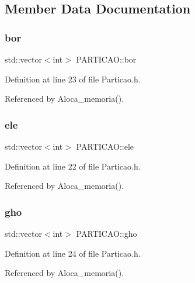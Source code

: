 \subsection{Member Data Documentation}
\mbox{\label{structPARTICAO_ac37aba358c6ada60310d8ebc054ffb5c}} 
\subsubsection{\texorpdfstring{bor}{bor}}
{\footnotesize\ttfamily std\+::vector$<$int$>$ P\+A\+R\+T\+I\+C\+A\+O\+::bor}



Definition at line 23 of file Particao.\+h.



Referenced by Aloca\+\_\+memoria().

\mbox{\label{structPARTICAO_a1fac22569e19bcd3263740493f6ade13}} 
\subsubsection{\texorpdfstring{ele}{ele}}
{\footnotesize\ttfamily std\+::vector$<$int$>$ P\+A\+R\+T\+I\+C\+A\+O\+::ele}



Definition at line 22 of file Particao.\+h.



Referenced by Aloca\+\_\+memoria().

\mbox{\label{structPARTICAO_ac90e9e5bcdfe5645bfa5ae8bb165669c}} 
\subsubsection{\texorpdfstring{gho}{gho}}
{\footnotesize\ttfamily std\+::vector$<$int$>$ P\+A\+R\+T\+I\+C\+A\+O\+::gho}



Definition at line 24 of file Particao.\+h.



Referenced by Aloca\+\_\+memoria().

